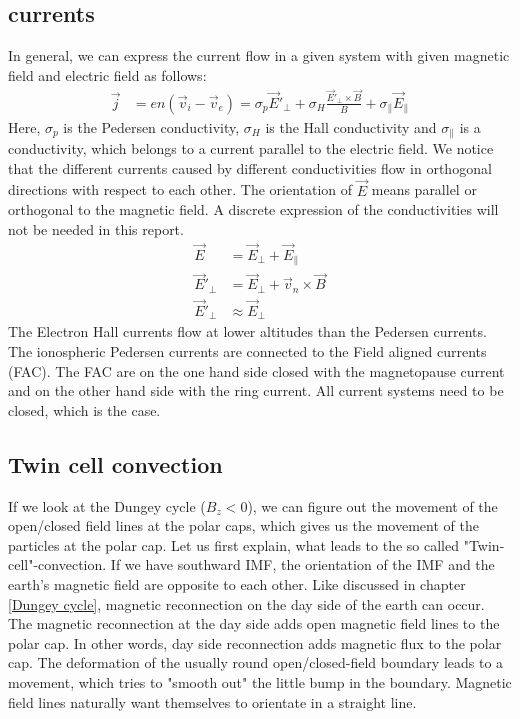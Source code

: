 \documentclass[10pt,a4paper]{article}
\begin{document}
\subsection{currents}
In general, we can express the current flow in a given system with given magnetic field and electric field as follows:
\begin{align}
\vec{j}&= e n ( \vec{v}_i - \vec{v}_e ) = \sigma_p \vec{E}'_{\perp} + \sigma_H \frac{\vec{E}'_{\perp} \times \vec{B}}{B} + \sigma_{\parallel} \vec{E}_{\parallel}
\end{align}
Here, $\sigma_p$ is the Pedersen conductivity, $\sigma_H$ is the Hall conductivity and $\sigma_{\parallel}$ is a conductivity, which belongs to a current parallel to the electric field. We notice that the different currents caused by different conductivities flow in orthogonal directions with respect to each other. The orientation of $\vec{E}$ means parallel or orthogonal to the magnetic field. A discrete expression of the conductivities will not be needed in this report. 
\begin{align}
\vec{E}&= \vec{E}_{\perp} +\vec{E}_{\parallel}\\
\vec{E}'_{\perp}&=\vec{E}_{\perp}+ \vec{v}_n \times \vec{B}\\
\vec{E}'_{\perp}& \approx \vec{E}_{\perp}
\end{align}
The Electron Hall currents flow at lower altitudes than the Pedersen currents. 
The ionospheric Pedersen currents are connected to the Field aligned currents (FAC). The FAC are on the one hand side closed with the magnetopause current and on the other hand side with the ring current. All current systems need to be closed, which is the case. 

\subsection{Twin cell convection}
If we look at the Dungey cycle ($B_z<0$), we can figure out the movement of the open/closed field lines at the polar caps, which gives us the movement of the particles at the polar cap. 
Let us first explain, what leads to the so called "Twin-cell"-convection. If we have southward IMF, the orientation of the IMF and the earth's magnetic field are opposite to each other. Like discussed in chapter \ref{Dungey cycle}, magnetic reconnection on the day side of the earth can occur. The magnetic reconnection at the day side adds open magnetic field lines to the polar cap. In other words, day side reconnection adds magnetic flux to the polar cap. 
The deformation of the usually round open/closed-field boundary leads to a movement, which tries to "smooth out" the little bump in the boundary. Magnetic field lines naturally want themselves to orientate in a straight line. 
\end{document}
